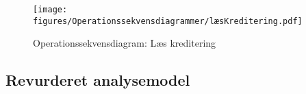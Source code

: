 \begin{figure}[h]
\centering
\texttt{[image: figures/Operationssekvensdiagrammer/læsKreditering.pdf]}
\caption{Operationssekvensdiagram: Læs kreditering}
\label{fig:op_read_credit}
\end{figure}

\subsection{Revurderet analysemodel}


